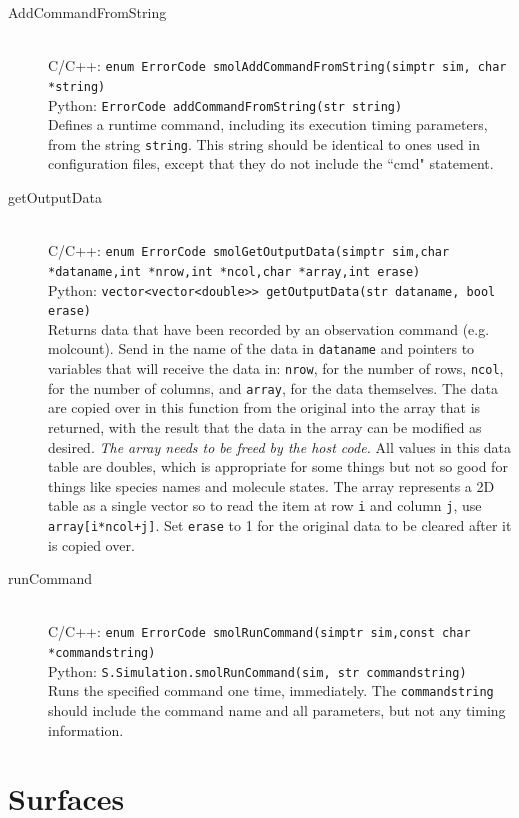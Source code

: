\documentclass {scrbook}
\newcommand {\ttt} {\texttt}
\begin{document}
\begin{description}
\item[AddCommandFromString]
\hfill \\
C/C++: \ttt{enum ErrorCode smolAddCommandFromString(simptr sim, char *string)}\\
Python: \ttt{ErrorCode addCommandFromString(str string)}\\
Defines a runtime command, including its execution timing parameters, from the string \ttt{string}. This string should be identical to ones used in configuration files, except that they do not include the ``cmd" statement.

\item[getOutputData]
\hfill \\
C/C++: \ttt{enum ErrorCode smolGetOutputData(simptr sim,char *dataname,int *nrow,int *ncol,char *array,int erase)}\\
Python: \ttt{vector<vector<double>> getOutputData(str dataname, bool erase)}\\
Returns data that have been recorded by an observation command (e.g. molcount). Send in the name of the data in \ttt{dataname} and pointers to variables that will receive the data in: \ttt{nrow}, for the number of rows, \ttt{ncol}, for the number of columns, and \ttt{array}, for the data themselves. The data are copied over in this function from the original into the array that is returned, with the result that the data in the array can be modified as desired. \textit{The array needs to be freed by the host code.} All values in this data table are doubles, which is appropriate for some things but not so good for things like species names and molecule states. The array represents a 2D table as a single vector so to read the item at row \ttt{i} and column \ttt{j}, use \ttt{array[i*ncol+j]}. Set \ttt{erase} to 1 for the original data to be cleared after it is copied over.

\item[runCommand]
\hfill \\
C/C++: \ttt{enum ErrorCode smolRunCommand(simptr sim,const char *commandstring)}\\
Python: \ttt{S.Simulation.smolRunCommand(sim, str commandstring)}\\
Runs the specified command one time, immediately. The \ttt{commandstring} should include the command name and all parameters, but not any timing information.

\end{description}


\section{Surfaces}
\end{document}
